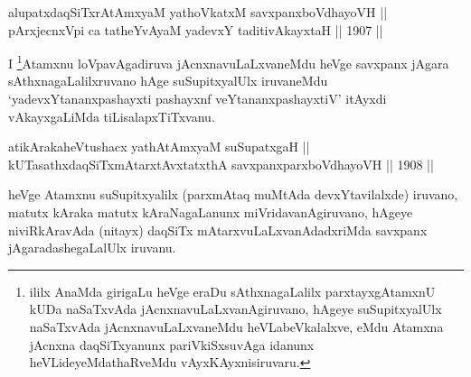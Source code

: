 
\begin{shl}
alupatxdaqSiTxrAtAmx\s yaM yathoVkatxM savxpanxboVdhayoVH || \\
pArxjecnxV\s pi ca tatheYvAyaM yadevxY taditivAkayxtaH \hfill || 1907 ||
  
\end{shl}

\begin{artha}
I \footnote[1]{ililx AnaMda girigaLu heVge eraDu sAthxnagaLalilx
parxtayxgAtamxnU kUDa naSaTxvAda jAcnxnavuLaLxvanAgiruvano, hAgeye
suSupitxyalUlx naSaTxvAda jAcnxnavuLaLxvaneMdu heVLabeVkalalxve,
eMdu Atamxna jAcnxna daqSiTxyanunx pariVkiSxsuvAga idanunx
heVLideyeMdathaRveMdu vAyxKAyxnisiruvaru.}Atamxnu loVpavAgadiruva jAcnxnavuLaLxvaneMdu heVge
savxpanx jAgara sAthxnagaLalilxruvano hAge suSupitxyalUlx iruvaneMdu
`yadevxYtananxpashayxti pashayxnf veYtananxpashayxtiV' itAyxdi vAkayxgaLiMda tiLisalapxTiTxvanu.
\end{artha}


\begin{shl}
atikArakaheVtushacx yathA\s \s tAmx\s yaM suSupatxgaH || \\
kUTasathxdaqSiTxmAtarxtAvxtatxthA savxpanxparxboVdhayoVH \hfill || 1908 ||
  
\end{shl}

\begin{artha}
heVge Atamxnu suSupitxyalilx (parxmAtaq muMtAda devxYtavilalxde)
iruvano, matutx kAraka matutx kAraNagaLanunx miVridavanAgiruvano,
hAgeye niviRkAravAda (nitayx) daqSiTx mAtarxvuLaLxvanAdadxriMda
savxpanx jAgaradashegaLalUlx iruvanu.
\end{artha}

